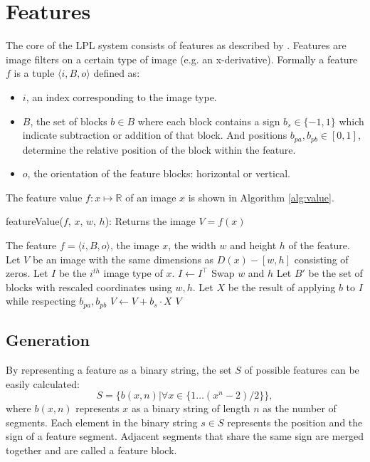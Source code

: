 \documentclass[a4paper,11pt]{article}
\begin{document}
\section{Features} \label{sec:feat}
The core of the LPL system consists of features as described by
\cite{dlagnekov_thesis, zhang,naturaltext}. Features are image filters on a
certain type of image (e.g. an x-derivative). Formally a feature $f$ is a
tuple $\langle i, B, o \rangle$ defined as:
\begin{itemize}
	\item{$i$, an index corresponding to the image type.}
	\item{$B$, the set of blocks $b \in B$ where each block contains a sign
	$b_s \in \{-1,1\}$ which indicate subtraction or addition of that block.
	And positions $b_{pa},b_{pb} \in [0,1]$, determine the relative
	position of the block within the feature.}
	\item{$o$, the orientation of the feature blocks: horizontal or vertical.}
\end{itemize}
The feature value $f:x\mapsto\mathbb{R}$ of an image $x$ is shown in Algorithm
\ref{alg:value}.
\begin{algorithm}
	\caption{featureValue($f$, $x$, $w$, $h$): Returns the image $V = f(x)$}
	\begin{algorithmic}[1]
	\REQUIRE The feature $f = \langle i, B, o \rangle$, the image $x$, the width $w$ and height $h$ of the feature.
	\medskip
	\STATE Let $V$ be an image with the same dimensions as $D(x)-[w, h]$ consisting of zeros.
	\STATE Let $I$ be the $i^{th}$ image type of $x$.
		\STATE $I \leftarrow I^\top$
		\STATE Swap $w$ and $h$
	\ENDIF
	\STATE Let $B'$ be the set of blocks with rescaled coordinates using $w,h$.
		\STATE Let $X$ be the result of applying $b$ to $I$ while respecting $b_{pa}, b_{pb}$
		\STATE $V \leftarrow V + b_s \cdot X$
	\ENDFOR
	\RETURN $V$
	\end{algorithmic}
\label{alg:value}
\end{algorithm}

\subsection{Generation} \label{sec:gen}
By representing a feature as a binary string, the set $S$ of possible features
can be easily calculated:
$$S = \{b(x,n) | \forall x \in \{1\ldots(x^n-2)/2\}\},$$
where $b(x,n)$ represents $x$ as a binary string of length $n$ as the number of
segments. Each element in the binary string $s \in S$ represents the position
and the sign of a feature segment. Adjacent segments that share the same sign
are merged together and are called a feature block.
\end{document}
